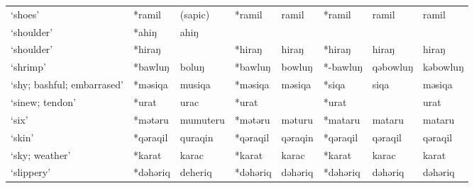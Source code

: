 \begin{landscape}
\begin{longtable}[c]{@{}p{3cm}<{\raggedright}p{2.75cm}<{\raggedright}p{2.75cm}<{\raggedright}p{2.75cm}<{\raggedright}p{2.75cm}<{\raggedright}p{2.75cm}<{\raggedright}p{2.75cm}<{\raggedright}p{2.75cm}<{\raggedright}@{}}
`shoes'                                              & *ramil             & (sapic)                        & *ramil             & ramil                      & *ramil           & ramil                    & ramil                             \\
`shoulder'                                           & *ahiŋ              & ahiŋ                           &                    &                            &                  &                          &                                   \\
`shoulder'                                           & *hiraŋ             &                                & *hiraŋ             & hiraŋ                      & *hiraŋ           & hiraŋ                    & hiraŋ                             \\
`shrimp'                                             & *bawluŋ            & boluŋ                          & *bawluŋ            & bowluŋ                     & *-bawluŋ         & qəbowluŋ                 & kəbowluŋ                          \\
`shy; bashful; embarrased'                           & *məsiqa            & musiqa                         & *məsiqa            & məsiqa                     & *siqa            & siqa                     & məsiqa                            \\
`sinew; tendon'                                      & *urat              & urac                           & *urat              &                            & *urat            &                          & urat                              \\
`six'                                                & *mətəru            & mumuteru                       & *mətəru            & məturu                     & *mataru          & mataru                   & mataru                            \\
`skin'                                               & *qəraqil           & quraqin                        & *qəraqil           & qəraqin                    & *qəraqil         & qəraqil                  & qəraqil                           \\
`sky; weather'                                       & *karat             & karac                          & *karat             & karac                      & *karat           & karac                    & karat                             \\
`slippery'                                           & *dəhəriq           & deheriq                        & *dəhəriq           & dəhəriq                    & *dəhəriq         & dəhəriq                  & dəhəriq                           \\

\end{longtable}
\end{landscape}
